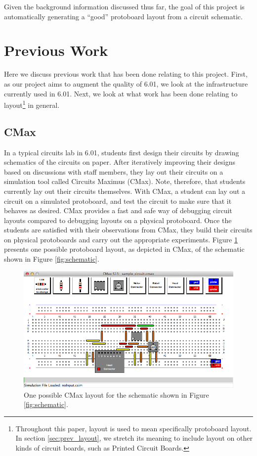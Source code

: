Given the background information discussed thus far, the goal of this project is
automatically generating a ``good'' protoboard layout from a circuit schematic.

\section{Previous Work}

Here we discuss previous work that has been done relating to this project.
First, as our project aims to augment the quality of 6.01, we look at the
infrastructure currently used in 6.01. Next, we look at what work has
been done relating to layout\footnote{Throughout this paper, layout is used to
mean specifically protoboard layout. In section \ref{sec:prev_layout}, we
stretch its meaning to include layout on other kinds of circuit boards,
such as Printed Circuit Boards.} in general.

\subsection{CMax}

In a typical circuits lab in 6.01, students first design their circuits by
drawing schematics of the circuits on paper.
After iteratively improving their designs based on discussions with staff
members, they lay out their circuits on a simulation tool called Circuits Maximus
(CMax)\cite{cmax}. Note, therefore, that students currently lay out their
circuits themselves.
With CMax, a student can lay out a circuit on a simulated protoboard, and test
the circuit to make sure that it behaves as desired. CMax provides a fast
and safe way of debugging circuit layouts compared to debugging layouts on a
physical protoboard. Once the students are satisfied with their
observations from CMax, they build their circuits on physical protoboards and
carry out the appropriate experiments. Figure \ref{fig:cmax_sample} presents one
possible protoboard layout, as depicted in CMax, of the schematic shown in
Figure \ref{fig:schematic}.

\begin{figure}
\begin{center}
\includegraphics[width=\textwidth]{Images/sample_circuit.png}
\caption[CMax]{One possible CMax layout for the schematic shown in Figure
\ref{fig:schematic}.}
\label{fig:cmax_sample}
\end{center}
\end{figure}

